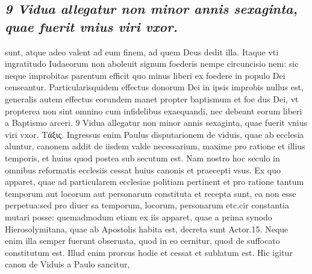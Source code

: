 \documentclass{article}
\begin{document}
\begin{pages}
\subsection*{\textit{9 Vidua allegatur non minor annis sexaginta, quae fuerit vnius viri vxor.}}sunt, atque adeo valent ad eum finem, ad quem Deus dedit illa. Itaque vti ingratitudo Iudaeorum non aboleuit signum foederis nempe circuncisio nem: sic neque improbitas parentum efficit quo minus liberi ex foedere in populo Dei censeantur. Particularisquidem effectus donorum Dei in ipsis improbis nullus est, generalis autem effectus eorundem manet propter baptismum et foe dus Dei, vt propterea non sint omnino cum infidelibus exaequandi, nec debeant eorum liberi a Baptismo arceri. 9 Vidua allegatur non minor annis sexaginta, quae fuerit vnius viri vxor. Τάξις. Ingressus enim Paulus disputarionem de viduis, quae ab ecclesia aluntur, canonem addit de iisdem valde necessarium, maxime pro ratione et illius temporis, et huius quod postea sub secutum est. Nam nostro hoc seculo in omnibus reformatis ecclesiis cessat huius canonis et praecepti vsus. Ex quo apparet, quae ad particularem ecclesiae politiam pertinent et pro ratione tantum temporum aut locorum aut personarum constituta et recepta sunt, ea non esse perpetua:sed pro diuer sa temporum, locorum, personarum etc.cir constantia mutari posse: quemadmodum etiam ex iis apparet, quae a prima synodo Hierosolymitana, quae ab Apostolis habita est, decreta sunt Actor.15. Neque enim illa semper fuerunt obseruata, quod in eo cernitur, quod de suffocato constitutum est. Illud enim prorsus hodie et cessat et sublatum est. Hic igitur canon de Viduis a Paulo sancitur,  \pend

\end{pages}
\end{document}
